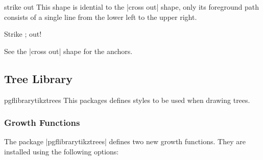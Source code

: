 \begin{shape}{strike out}
  This shape is idential to the |cross out| shape, only its foreground
  path consists of a single line from the lower left to the upper
  right.
  
\begin{codeexample}[]
Strike \tikz[baseline] ; out!  
\end{codeexample}

  See the |cross out| shape for the anchors.
\end{shape}



\subsection{Tree Library}

\label{section-tree-library}


\begin{package}{pgflibrarytikztrees}
  This packages defines styles to be used when drawing trees. 
\end{package}

\subsubsection{Growth Functions}

The package |pgflibrarytikztrees| defines two new growth
functions. They are installed using the following options:

